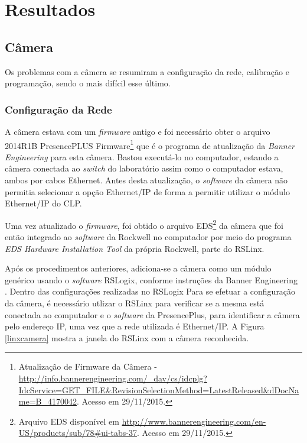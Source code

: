 \chapter{Resultados\label{chap:Resultados}}




\section{Câmera}

Os problemas com a câmera se resumiram a configuração da rede, calibração e programação, sendo o mais difícil esse último.

\subsection{Configuração da Rede}
A câmera estava com um \textit{firmware} antigo e foi necessário obter o arquivo 2014R1B PresencePLUS Firmware\footnote{Atualização de Firmware da Câmera - \url{http://info.bannerengineering.com/_dav/cs/idcplg?IdcService=GET_FILE&RevisionSelectionMethod=LatestReleased&dDocName=B_4170042}. Acesso em 29/11/2015.} que é o programa de atualização da \textit{Banner Engineering} para esta câmera. Bastou executá-lo no computador, estando a câmera conectada ao \textit{switch} do laboratório assim como o computador estava, ambos por cabos Ethernet. Antes desta atualização, o \textit{software} da câmera não permitia selecionar a opção Ethernet/IP de forma a permitir utilizar o módulo Ethernet/IP do CLP.

Uma vez atualizado o \textit{firmware}, foi obtido o arquivo EDS\footnote{Arquivo EDS disponível em \url{http://www.bannerengineering.com/en-US/products/sub/78\#ui-tabs-37}. Acesso em 29/11/2015.} da câmera que foi então integrado ao \textit{software} da Rockwell no computador por meio do programa \textit{EDS Hardware Installation Tool} da própria Rockwell, parte do RSLinx.

Após os procedimentos anteriores, adiciona-se a câmera como um módulo genérico usando o \textit{software} RSLogix, conforme instruções da Banner Engineering \cite{presencePlusEthernetIP}. Dentro das configurações realizadas no RSLogix Para se efetuar a configuração da câmera, é necessário utlizar o RSLinx para verificar se a mesma está conectada ao computador e o \textit{software} da PresencePlus, para identificar a câmera pelo endereço IP, uma vez que a rede utilizada é Ethernet/IP. A Figura \ref{linxcamera} mostra a janela do RSLinx com a câmera reconhecida.

